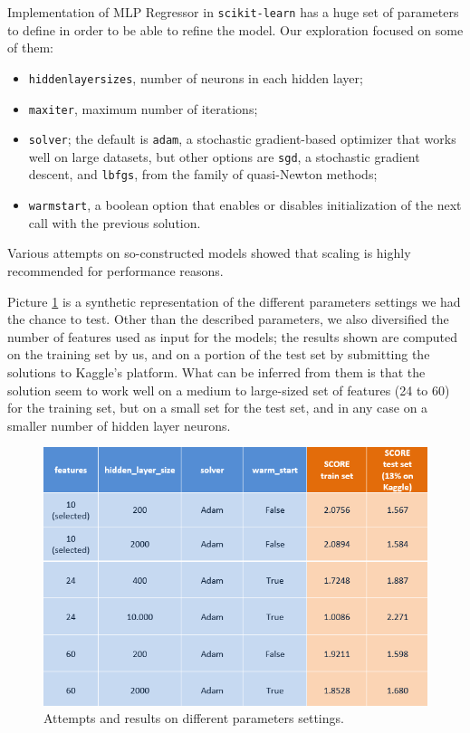 Implementation of MLP Regressor in \texttt{scikit-learn} has a huge set of parameters to define in order to be able to refine the model.
Our exploration focused on some of them:
\begin{itemize}
	\item \texttt{hidden\textunderscore layer\textunderscore sizes}, number of neurons in each hidden layer;
	\item \texttt{max\textunderscore iter}, maximum number of iterations;
	\item \texttt{solver}; the default is \texttt{adam}, a stochastic gradient-based optimizer that works well on large datasets, but other options are \texttt{sgd}, a stochastic gradient descent, and \texttt{lbfgs}, from the family of quasi-Newton methods;
	\item \texttt{warm\textunderscore start}, a boolean option that enables or disables initialization of the next call with the previous solution.
\end{itemize}
Various attempts on so-constructed models showed that scaling is highly recommended for performance reasons.

Picture \ref{fig:NNtries} is a synthetic representation of the different parameters settings we had the chance to test. Other than the described parameters, we also diversified the number of features used as input for the models; the results shown are computed on the training set by us, and on a portion of the test set by submitting the solutions to Kaggle's platform. What can be inferred from them is that the solution seem to work well on a medium to large-sized set of features (24 to 60) for the training set, but on a small set for the test set, and in any case on a smaller number of hidden layer neurons.

\begin{figure} [h]
	\centering
	\includegraphics[width=0.9\linewidth]{pictures/table2.png}
	\caption{Attempts and results on different parameters settings.}
	\label{fig:NNtries}
\end{figure}

